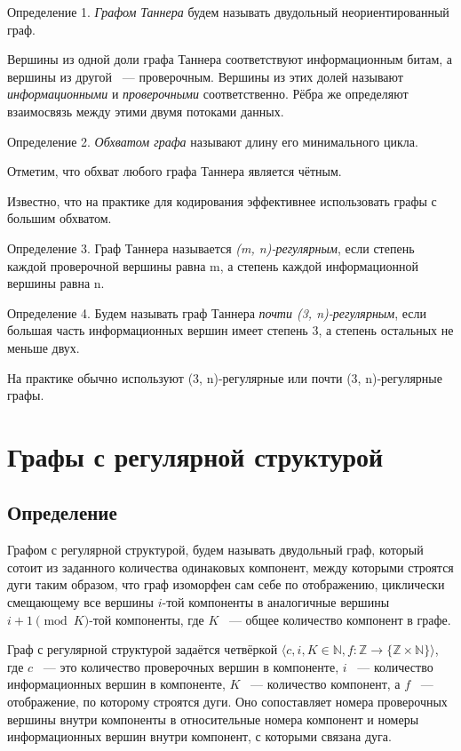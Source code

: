 \documentclass[14pt]{mmcs_article}
\begin{document}
Определение 1. \textsl{Графом Таннера} будем называть двудольный неориентированный граф.

Вершины из одной доли графа Таннера соответствуют информационным битам, а вершины из другой ~--- проверочным. Вершины из этих долей называют \textsl{информационными} и \textsl{проверочными} соответственно. Рёбра же определяют взаимосвязь между этими двумя потоками данных.

Определение 2. \textsl{Обхватом графа} называют длину его минимального цикла.

Отметим, что обхват любого графа Таннера является чётным.

Известно, что на практике для кодирования эффективнее использовать графы с большим обхватом.

Определение 3. Граф Таннера называется \textsl{(m, n)-регулярным}, если степень каждой проверочной вершины равна m, а степень каждой информационной вершины равна n.

Определение 4. Будем называть граф Таннера \textsl{почти (3, n)-регулярным}, если большая часть информационных вершин имеет степень 3, а степень остальных не меньше двух.

На практике обычно используют (3, n)-регулярные или почти (3, n)-регулярные графы.

\newpage
\section{Графы с регулярной структурой}

\subsection{Определение}

Графом с регулярной структурой, будем называть двудольный граф, который сотоит из заданного количества одинаковых компонент, между которыми строятся дуги таким образом, что граф изоморфен сам себе по отображению, циклически смещающему все вершины $i$-той компоненты в аналогичные вершины $i + 1 \pmod K$-той компоненты, где $K$ ~--- общее количество компонент в графе.

Граф с регулярной структурой задаётся четвёркой $\langle c, i, K \in \mathbb{N}, f: \mathbb{Z} \rightarrow \{ \mathbb{Z} \times \mathbb{N} \} \rangle$, где $c$ ~--- это количество проверочных вершин в компоненте, $i$ ~--- количество информационных вершин в компоненте, $K$ ~--- количество компонент, а $f$ ~--- отображение, по которому строятся дуги. Оно сопоставляет номера проверочных вершины внутри компоненты в относительные номера компонент и номеры информационных вершин внутри компонент, с которыми связана дуга.
\end{document}
